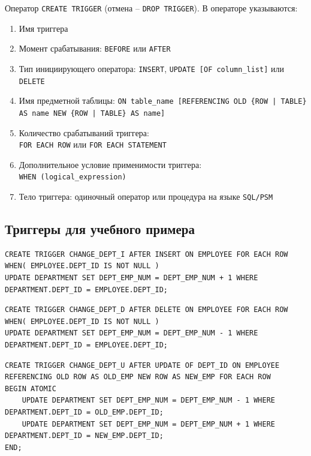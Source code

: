 \documentclass[a4paper,12pt]{article}
\begin{document}
Оператор \texttt{CREATE TRIGGER} (отмена – \texttt{DROP TRIGGER}). В операторе указываются:
\begin{enumerate}
    \item Имя триггера
    \item Момент срабатывания: \texttt{BEFORE} или \texttt{AFTER}
    \item Тип инициирующего оператора: \texttt{INSERT}, \texttt{UPDATE [OF column\_list]} или \texttt{DELETE}
    \item Имя предметной таблицы: \texttt{ON table\_name [REFERENCING OLD \{ROW | TABLE\} AS name NEW \{ROW | TABLE\} AS name]}
    \item Количество срабатываний триггера: \\ \texttt{FOR EACH ROW} или \texttt{FOR EACH STATEMENT}
    \item Дополнительное условие применимости триггера: \\ \texttt{WHEN (logical\_expression)}
    \item Тело триггера: одиночный оператор или процедура на языке \texttt{SQL/PSM}
\end{enumerate}

\subsection{Триггеры для учебного примера}

\begin{lstlisting}
CREATE TRIGGER CHANGE_DEPT_I AFTER INSERT ON EMPLOYEE FOR EACH ROW
WHEN( EMPLOYEE.DEPT_ID IS NOT NULL )
UPDATE DEPARTMENT SET DEPT_EMP_NUM = DEPT_EMP_NUM + 1 WHERE DEPARTMENT.DEPT_ID = EMPLOYEE.DEPT_ID;
\end{lstlisting}

\begin{lstlisting}
CREATE TRIGGER CHANGE_DEPT_D AFTER DELETE ON EMPLOYEE FOR EACH ROW
WHEN( EMPLOYEE.DEPT_ID IS NOT NULL )
UPDATE DEPARTMENT SET DEPT_EMP_NUM = DEPT_EMP_NUM - 1 WHERE DEPARTMENT.DEPT_ID = EMPLOYEE.DEPT_ID;
\end{lstlisting}

\begin{lstlisting}
CREATE TRIGGER CHANGE_DEPT_U AFTER UPDATE OF DEPT_ID ON EMPLOYEE
REFERENCING OLD ROW AS OLD_EMP NEW ROW AS NEW_EMP FOR EACH ROW
BEGIN ATOMIC
    UPDATE DEPARTMENT SET DEPT_EMP_NUM = DEPT_EMP_NUM - 1 WHERE DEPARTMENT.DEPT_ID = OLD_EMP.DEPT_ID;
    UPDATE DEPARTMENT SET DEPT_EMP_NUM = DEPT_EMP_NUM + 1 WHERE DEPARTMENT.DEPT_ID = NEW_EMP.DEPT_ID;
END;
\end{lstlisting}
\end{document}
